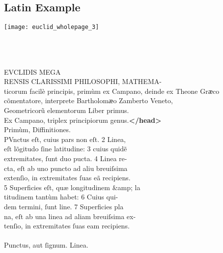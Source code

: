 \tocspace
\subsection{Latin Example}
\label{Structural markup general example}

\texttt{[image: euclid\_wholepage\_3]}
\clearpage

\begin{typeLatin}
 \\
 \\
 \\
EVCLIDIS MEGA \\
RENSIS CLARISSIMI PHILOSOPHI, MATHEMA- \\
ticorum facilè principis, primùm ex Campano, deinde ex Theone Grӕco \\
cõmentatore, interprete Bartholomӕo Zamberto Veneto, \\
Geometricorũ elementorum Liber primus. \\
Ex Campano, triplex principiorum genus.\textbf{</head>} \\
Primùm, Diffinitiones. \\
PVnctus eſt, cuius pars non eſt. 2 Linea, \\
eſt lõgitudo ſine latitudine: 3 cuius quidẽ \\
extremitates, ſunt duo p\bs\tld{}ucta. 4 Linea re- \\
cta, eſt ab uno puncto ad ali\bs\tld{}u breuiſsima \\
extenſio, in extremitates ſuas eã recipiens. \\
5 Superficies eſt, quæ longitudinem &amp; la \\
titudinem tantùm habet: 6 Cuius qui- \\
dem termini, ſunt line. 7 Superficies pla \\
na, eſt ab una linea ad aliam breuiſsima ex- \\
tenſio, in extremitates ſuas eam recipiens.\\
\\
Punctus, aut ſignum. \lwr{}Linea.\\

\end{typeLatin}
